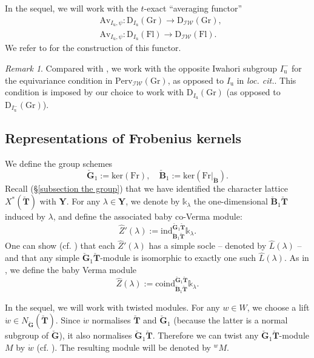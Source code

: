 \documentclass[11pt]{amsart}
\theoremstyle{plain}
\theoremstyle{remark}
\newtheorem{rem}[thm]{Remark}
\numberwithin{equation}{section}
\begin{document}
In the sequel, we will work with the $t$-exact ``averaging functor''
\begin{align*}
    &\mathrm{Av}_{I_\mathrm{u},\psi}:\mathrm{D}_{I_\mathrm{u}}(\mathrm{Gr})\to \mathrm{D}_{\mathcal{IW}}(\mathrm{Gr}),\\
    &\mathrm{Av}_{I_\mathrm{u},\psi}:\mathrm{D}_{I_\mathrm{u}}(\mathrm{Fl})\to \mathrm{D}_{\mathcal{IW}}(\mathrm{Fl}). 
\end{align*}
We refer to \cite[§3.6-3.8]{achar2021geometric} for the construction of this functor.
 \begin{rem}
     Compared with \cite{JEP_2019__6__707_0}, we work with the opposite Iwahori subgroup $I_\mathrm{u}^-$ for the equivariance condition in $\mathrm{Perv}_{\mathcal{IW}}(\mathrm{Gr})$, as opposed to $I_\mathrm{u}$ in \textit{loc. cit.}. This condition is imposed by our choice to work with $\mathrm{D}_{I_\mathrm{u}}(\mathrm{Gr})$ (as opposed to $\mathrm{D}_{I_\mathrm{u}^-}(\mathrm{Gr})$).
 \end{rem}
 \subsection{Representations of Frobenius kernels}
We define the group schemes
 $$\check{\mathbf{G}}_1:=\mathrm{ker}(\mathrm{Fr}),\quad\check{\mathbf{B}}_1:=\mathrm{ker}(\mathrm{Fr}|_{\check{\mathbf{B}}}). $$
Recall (§\ref{subsection the group}) that we have identified the character lattice $X^*(\check{\mathbf{T}})$ with $\mathbf{Y}$. For any $\lambda\in\mathbf{Y}$, we denote by $\mathbb{k}_\lambda$ the one-dimensional $\check{\mathbf{B}}_1\check{\mathbf{T}}$ induced by $\lambda$, and define the associated baby co-Verma module:
$$\widehat{Z}'(\lambda):=\mathrm{ind}_{\check{\mathbf{B}}_1\check{\mathbf{T}}}^{\check{\mathbf{G}}_1\check{\mathbf{T}}}\mathbb{k}_\lambda.$$
One can show (cf. \cite[Part II, Proposition 9.6]{jantzen2003representations}) that each $\widehat{Z}'(\lambda)$ has a simple socle -- denoted by $\widehat{L}(\lambda)$ -- and that any simple $\check{\mathbf{G}}_1\check{\mathbf{T}}$-module is isomorphic to exactly one such $\widehat{L}(\lambda)$. As in \cite[Proposition 9.6]{jantzen2003representations}, we define the baby Verma module
$$\widehat{Z}(\lambda):=\mathrm{coind}_{\check{\mathbf{B}}_1\check{\mathbf{T}}}^{\check{\mathbf{G}}_1\check{\mathbf{T}}}\mathbb{k}_\lambda.$$

In the sequel, we will work with twisted modules. For any $w\in W$, we choose a lift $\dot{w}\in N_{\check{\mathbf{G}}}(\check{\mathbf{T}})$. Since $\dot{w}$ normalises $\check{\mathbf{T}}$ and $\check{\mathbf{G}}_1$ (because the latter is a normal subgroup of $\check{\mathbf{G}}$), it also normalises $\check{\mathbf{G}}_1\check{\mathbf{T}}$. Therefore we can twist any $\check{\mathbf{G}}_1\check{\mathbf{T}}$-module $M$ by $\dot{w}$ (cf. \cite[§I.2.15]{jantzen2003representations}). The resulting module will be denoted by ${^wM}$. 
 
\end{document}
